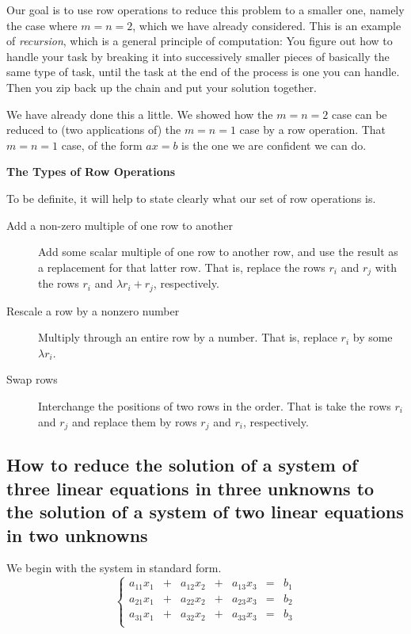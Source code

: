 \documentclass[00-livre-main.tex]{subfiles}
\begin{document}
Our goal is to use row operations to reduce this problem to a smaller one, namely the case where $m=n=2$, which we have already considered. This is an example of \emph{recursion}, which is a general principle of computation: You figure out how to handle your task by breaking it into successively smaller pieces of basically the same type of task, until the task at the end of the process is one you can handle. Then you zip back up the chain and put your solution together.

We have already done this a little. We showed how the $m=n=2$ case can be reduced to (two applications of) the $m=n=1$ case by a row operation. That $m=n=1$ case, of the form $ax=b$ is the one we are confident we can do.

\vfill

\textbf{The Types of Row Operations}

To be definite, it will help to state clearly what our set of row operations is. 

\begin{description}
\item[Add a non-zero multiple of one row to another] Add some scalar multiple of one row to another row, and use the result as a replacement for that latter row. That is, replace the rows $r_i$ and $r_j$ with the rows $r_i$ and $\lambda r_i + r_j$, respectively.

\item[Rescale a row by a nonzero number] Multiply through an entire row by a number. That is, replace $r_i$ by some $\lambda r_i$.

\item[Swap rows] Interchange the positions of two rows in the order. That is take the rows $r_i$ and $r_j$ and replace them by rows $r_j$ and $r_i$, respectively.
\end{description}

\subsection*{How to reduce the solution of a system of three linear equations in three unknowns to the solution of a system of two linear equations in two unknowns}

We begin with the system in standard form.
\[
\left\{\begin{array}{rrrrrrr}
a_{11}x_1 & + & a_{12} x_2 & + & a_{13}x_3 & = & b_1 \\
a_{21}x_1 & + & a_{22} x_2 & + & a_{23}x_3 & = & b_2 \\
a_{31}x_1 & + & a_{32} x_2 & + & a_{33}x_3 & = & b_3 \\
\end{array}\right.
\]
\end{document}
